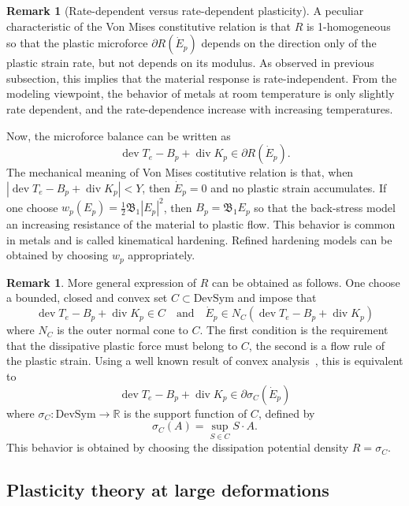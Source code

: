 \documentclass[a4paper,10pt,twoside]{amsbook}
\numberwithin{section}{chapter}
\numberwithin{equation}{chapter}
\theoremstyle{definition}
\newtheorem{rmk}[prop]{Remark}
\DeclareMathOperator{\dev}{dev}
\DeclareMathOperator{\diver}{div}
\begin{document}
\begin{rmk}[Rate-dependent versus rate-dependent plasticity]
A peculiar characteristic of the Von Mises constitutive relation is that $R$ is 1-homogeneous so that the plastic microforce $\partial R(\dot E_p)$ depends on the direction only of the plastic strain rate, but not depends on its modulus. As observed in previous subsection, this implies that the material response is rate-independent. From the modeling viewpoint, the behavior of metals at room temperature is only slightly rate dependent, and the rate-dependence increase with increasing temperatures.
\end{rmk}
Now, the microforce balance can be written as
\[
\dev T_e-B_p+\diver K_p\in\partial R(\dot E_p).
\]
The mechanical meaning of Von Mises costitutive relation is that, when $|\dev T_e-B_p+\diver K_p|<Y$, then $\dot E_p=0$ and no plastic strain accumulates. If one choose $w_p(E_p)=\frac{1}{2}\mathfrak{B}_1|E_p|^2$, then $B_p=\mathfrak{B}_1E_p$ so that the back-stress model an increasing resistance of the material to plastic flow. This behavior is common in metals and is called kinematical hardening. Refined hardening models can be obtained by choosing $w_p$ appropriately.
\begin{rmk}
\label{rmk:flow-rule}
More general expression of $R$ can be obtained as follows. One choose a bounded, closed and convex set $C\subset\text{DevSym}$ and impose that
\[
\dev T_e-B_p+\diver K_p\in C\quad\text{and}\quad\dot E_p\in N_C(\dev T_e-B_p+\diver K_p)
\]
where $N_C$ is the outer normal cone to $C$. The first condition is the requirement that the dissipative plastic force must belong to $C$, the second is a flow rule of the plastic strain. Using a well known result of convex analysis~\cite[Corollary 5.2]{ekeland-temam}, this is equivalent to
\[
\dev T_e-B_p+\diver K_p\in\partial\sigma_C(\dot E_p)
\]
where $\sigma_C\colon\text{DevSym}\to\mathbb{R}$ is the support function of $C$, defined by
\[
\sigma_C(A)=\sup_{S\in C}S\cdot A.
\]
This behavior is obtained by choosing the dissipation potential density $R=\sigma_C$.
\end{rmk}

\subsection{Plasticity theory at large deformations}
\end{document}
